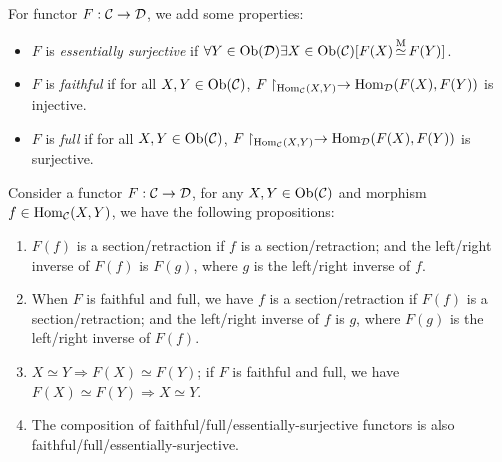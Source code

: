 \documentclass{article}
\begin{document}
\begin{defi}\label{different functors}
	For functor $F:\mathcal{C}\to\mathcal{D}$, we add some properties:
	\begin{itemize}
		\item $F$ is \emph{essentially surjective} if $\forall Y\in\mathrm{Ob}(\mathcal{D})\exists X\in\mathrm{Ob}(\mathcal{C})[F(X)\mathop{\simeq}\limits^\mathrm{M}F(Y)]$.
		\item $F$ is \emph{faithful} if for all $X,Y\in\mathrm{Ob}(\mathcal{C})$, $F\upharpoonright_{\mathrm{Hom}_{\mathcal{C}}(X,Y)}\to\mathrm{Hom}_{\mathcal{D}}(F(X),F(Y))$ is injective.
		\item $F$ is \emph{full} if for all $X,Y\in\mathrm{Ob}(\mathcal{C})$, $F\upharpoonright_{\mathrm{Hom}_{\mathcal{C}}(X,Y)}\to\mathrm{Hom}_{\mathcal{D}}(F(X),F(Y))$ is surjective.
	\end{itemize}
\end{defi}


\begin{lmm}\label{func ppt}
	Consider a functor $F:\mathcal{C}\to\mathcal{D}$, for any $X,Y\in\mathrm{Ob}(\mathcal{C})$ and morphism $f\in\mathrm{Hom}_{\mathcal{C}}(X,Y)$, we have the following propositions:
	\begin{enumerate}
		\item $F(f)$ is a section/retraction if $f$ is a section/retraction; and the left/right inverse of $F(f)$ is $F(g)$, where $g$ is the left/right inverse of $f$.
		\item When $F$ is faithful and full, we have $f$ is a section/retraction if $F(f)$ is a section/retraction; and the left/right inverse of $f$ is $g$, where $F(g)$ is the left/right inverse of $F(f)$.
		\item $X\simeq Y\Longrightarrow F(X)\simeq F(Y)$; if $F$ is faithful and full, we have $F(X)\simeq F(Y)\Longrightarrow X\simeq Y$.
		\item The composition of faithful/full/essentially-surjective functors is also faithful/full/essentially-surjective.
	\end{enumerate}
\end{lmm}
\end{document}
